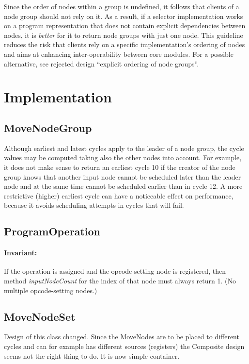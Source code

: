 \documentclass[a4paper,twoside]{tce}
\begin{document}
Since the order of nodes within a group is undefined, it follows that
clients of a node group should not rely on it. As a result, if a selector
implementation works on a program representation that does not contain
explicit dependencies between nodes, it is \emph{better} for it to return
node groups with just one node.
%
This guideline reduces the risk that clients rely on a specific
implementation's ordering of nodes and aims at enhancing inter-operability
between core modules.
%
For a possible alternative, see rejected design ``explicit ordering of node
groups''.

\section{Implementation}

\subsection{MoveNodeGroup}

Although earliest and latest cycles apply to the leader of a node group, the
cycle values may be computed taking also the other nodes into account. For
example, it does not make sense to return an earliest cycle 10 if the
creator of the node group knows that another input node cannot be scheduled
later than the leader node and at the same time cannot be scheduled earlier
than in cycle 12. A more restrictive (higher) earliest cycle can have a
noticeable effect on performance, because it avoids scheduling attempts in
cycles that will fail.

\subsection{ProgramOperation}
\label{ssec:ProgramOperation-imp}

\paragraph{Invariant:}
If the operation is assigned and the opcode-setting node is registered, then
method \emph{inputNodeCount} for the index of that node must always return
1. (No multiple opcode-setting nodes.)

\subsection{MoveNodeSet}
\label{ssec:MoveNodeSet-imp}

Design of this class changed. Since the MoveNodes are to be placed to
different cycles and can for example has different sources (registers) the
Composite design seems not the right thing to do. It is now simple container.
\end{document}

